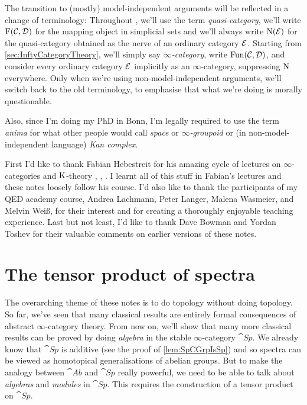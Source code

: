 \documentclass[DIV=12,numbers=enddot,leqno,bibliography=totoc]{scrartcl}
\begin{document}
\begin{numpar}
		The transition to (mostly) model-independent arguments will be reflected in a change of terminology: Throughout , we'll use the term  \emph{quasi-category}, we'll write $\operatorname{F}(\mathcal{C},\mathcal{D})$ for the mapping object in simplicial sets and we'll always write $\operatorname{N}(\mathcal{E})$ for the quasi-category obtained as the nerve of an ordinary category $\mathcal{E}$. Starting from \cref{sec:InftyCategoryTheory}, we'll simply say \emph{$\infty$-category}, write $\operatorname{Fun}(\mathcal{C},\mathcal{D})$, and consider every ordinary category $\mathcal{E}$ implicitly as an $\infty$-category, suppressing $\operatorname{N}$ everywhere. Only when we're using non-model-independent arguments, we'll switch back to the old terminology, to emphasise that what we're doing is morally questionable.
		
		Also, since I'm doing my PhD in Bonn, I'm legally required to use the term \emph{anima} for what other people would call \emph{space} or \emph{$\infty$-groupoid} or (in non-model-independent language) \emph{Kan complex}.
	\end{numpar}
	\begin{numpar}[Acknowledgments.]
		First I'd like to thank Fabian Hebestreit for his amazing cycle of lectures on $\infty$-categories and $\operatorname{K}$-theory \cite{HigherCatsI}, \cite{HigherCatsII}, \cite{KTheory}. I learnt all of this stuff in Fabian's lectures and these notes loosely follow his course. I'd also like to thank the participants of my QED academy course, Andrea Lachmann, Peter Langer, Malena Wasmeier, and Melvin Weiß, for their interest and for creating a thoroughly enjoyable teaching experience. Last but not least, I'd like to thank Dave Bowman and Yordan Toshev for their valuable comments on earlier versions of these notes.
	\end{numpar}
	
	\newpage
	
	
	
	
	
	\newpage
	
	
	
	
	\newpage
	\section{The tensor product of spectra}\label{sec:TensorProduct}
	The overarching theme of these notes is to do topology without doing topology. So far, we've seen that many classical results are entirely formal consequences of abstract $\infty$-category theory. From now on, we'll show that many more classical results can be proved by doing \emph{algebra} in the stable $\infty$-category $\cat{Sp}$. We already know that $\cat{Sp}$ is additive (see the proof of \cref{lem:SpCGrpIsSp}) and so spectra can be viewed as homotopical generalisations of abelian groups. But to make the analogy between $\cat{Ab}$ and $\cat{Sp}$ really powerful, we need to be able to talk about \emph{algebras} and \emph{modules} in $\cat{Sp}$. This requires the construction of a tensor product on $\cat{Sp}$.
	
\end{document}
